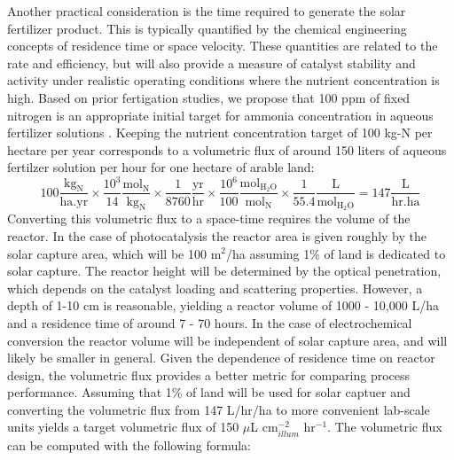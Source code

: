 Another practical consideration is the time required to generate the solar fertilizer product. This is typically quantified by the chemical engineering concepts of residence time or space velocity. These quantities are related to the rate and efficiency, but will also provide a measure of catalyst stability and activity under realistic operating conditions where the nutrient concentration is high. Based on prior fertigation studies, we propose that 100 ppm of fixed nitrogen is an appropriate initial target for ammonia concentration in aqueous fertilizer solutions \cite{phocaides2007handbook}. Keeping the nutrient concentration target of 100 kg-N per hectare per year corresponds to a volumetric flux of around 150 liters of aqueous fertilzer solution per hour for one hectare of arable land:
\begin{equation}
\mathrm{
100 \frac{kg_N}{ha . yr} \times \frac{10^3}{14} \frac{mol_{N}}{kg_N} \times \frac{1}{8760} \frac{yr}{hr} \times \frac{10^6}{100} \frac{mol_{H_2O}}{mol_{N}} \times \frac{1}{55.4} \frac{L}{mol_{H_2O}} = 147 \frac{L}{hr . ha} 
}
\end{equation}
Converting this volumetric flux to a space-time requires the volume of the reactor. In the case of photocatalysis the reactor area is given roughly by the solar capture area, which will be 100 m$^2$/ha assuming 1\% of land is dedicated to solar capture. The reactor height will be determined by the optical penetration, which depends on the catalyst loading and scattering properties. However, a depth of 1-10 cm is reasonable, yielding a reactor volume of 1000 - 10,000 L/ha and a residence time of around 7 - 70 hours. In the case of electrochemical conversion the reactor volume will be independent of solar capture area, and will likely be smaller in general. Given the dependence of residence time on reactor design, the volumetric flux provides a better metric for comparing process performance. Assuming that 1\% of land will be used for solar captuer and converting the volumetric flux from 147 L/hr/ha to more convenient lab-scale units yields a target volumetric flux of 150 $\mu$L cm$^{-2}_{illum}$ hr$^{-1}$. The volumetric flux can be computed with the following formula:

